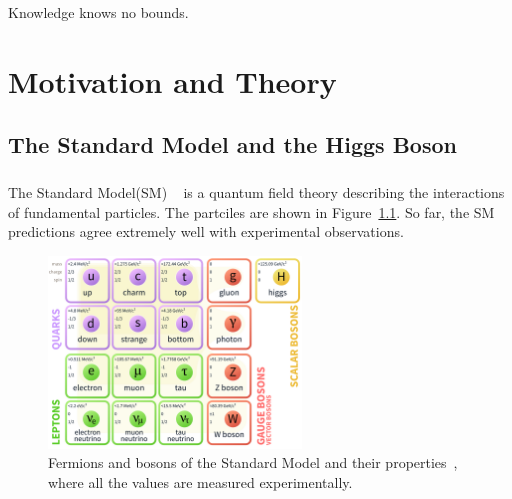 \begin{savequote}[75mm]
Knowledge knows no bounds.
\end{savequote}

\chapter{Motivation and Theory}

\section{The Standard Model and the Higgs Boson}
\paragraph{}
The Standard Model(SM) ~\cite{Pdg,Griffiths,Tully,Schwartz} is a quantum field theory describing the interactions of fundamental particles. The partciles are shown in Figure~\ref{fig:SM}. So far, the SM predictions agree extremely well with experimental observations.

\begin{figure}[h!]
  \centering
  \captionsetup{justification=centering}
  \includegraphics[width=0.6\textwidth]{figures/theory/SM}
  \caption{Fermions and bosons of the Standard Model and their properties~\cite{Pdg}, where all the values are measured experimentally.}
  \label{fig:SM}
\end{figure}

